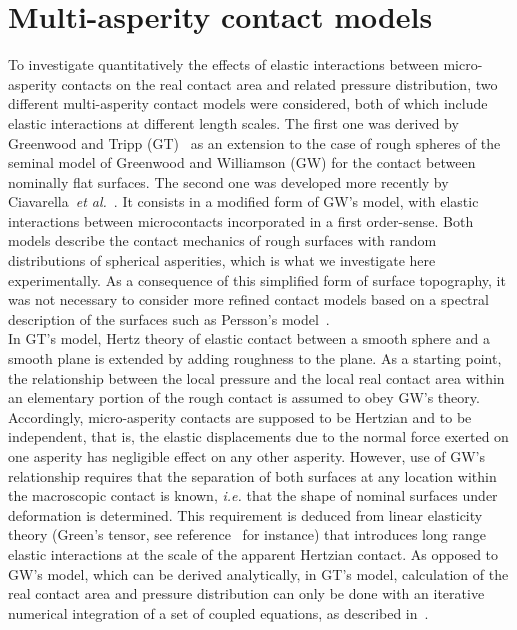 \documentclass[pre,groupedaddress,showkeys,showpacs,twocolumn]{revtex4}
\begin{document}
\section*{Multi-asperity contact models}
%
To investigate quantitatively the effects of elastic interactions between micro-asperity contacts on the real contact area and related pressure distribution, two different multi-asperity contact models were considered, both of which include elastic interactions at different length scales. The first one was derived by Greenwood and Tripp (GT)~\cite{greenwood1967} as an extension to the case of rough spheres of the seminal model of Greenwood and Williamson (GW) for the contact between nominally flat surfaces. The second one was developed more recently by Ciavarella~\textit{et al.}~\cite{ciavarella2006,ciavarella2008}. It consists in a modified form of GW's model, with elastic interactions between microcontacts incorporated in a first order-sense. Both models describe the contact mechanics of rough surfaces with random distributions of spherical asperities, which is what we investigate here experimentally. As a consequence of this simplified form of surface topography, it was not necessary to consider more 
refined contact models based on a spectral description of the surfaces such as Persson's model~\cite{persson2001}.\\
%
\indent In GT's model, Hertz theory of elastic contact between a smooth sphere and a smooth plane is extended by adding roughness to the plane. As a starting point, the relationship between the local pressure and the local real contact area within an elementary portion of the rough contact is assumed to obey GW's theory. Accordingly, micro-asperity contacts are supposed to be Hertzian and to be independent, that is, the elastic displacements due to the normal force exerted on one asperity has negligible effect on any other asperity. However, use of GW's relationship requires that the separation of both surfaces at any location within the macroscopic contact is known, \textit{i.e.} that the shape of nominal surfaces under deformation is determined. This requirement is deduced from linear elasticity theory (Green's tensor, see reference~\cite{landau1986} for instance) that introduces long range elastic interactions at the scale of the apparent Hertzian contact. As opposed to GW's model, which can be derived 
analytically, in GT's model, calculation of the real contact area and pressure distribution can only be done with an iterative numerical integration of a set of coupled equations, as described in~\cite{greenwood1967}.\\
\end{document}
